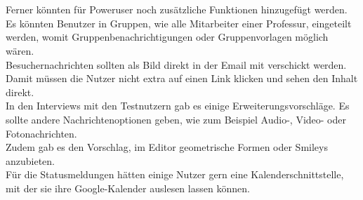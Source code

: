 % 
% 
% 
\\
\\
Ferner könnten für Poweruser noch zusätzliche Funktionen hinzugefügt werden.
\\
Es könnten Benutzer in Gruppen, wie \bspw alle Mitarbeiter einer Professur, eingeteilt werden, womit Gruppenbenachrichtigungen oder Gruppenvorlagen möglich wären.
\\
Besuchernachrichten sollten als Bild direkt in der Email mit verschickt werden.
Damit müssen die Nutzer nicht extra auf einen Link klicken und sehen den Inhalt direkt.
\\
In den Interviews mit den Testnutzern gab es einige Erweiterungsvorschläge.
Es sollte andere Nachrichtenoptionen geben, wie zum Beispiel Audio-, Video- oder Fotonachrichten.
\\
Zudem gab es den Vorschlag, im Editor geometrische Formen oder Smileys anzubieten.
\\
Für die Statusmeldungen hätten einige Nutzer gern eine Kalenderschnittstelle, mit der sie ihre Google-Kalender auslesen lassen können.
% 
% 
% 
% 
